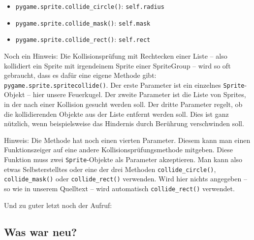 \begin{itemize}
    \item \texttt{pygame.sprite.collide\_circle()}: \texttt{self.radius}
    \item \texttt{pygame.sprite.collide\_mask()}: \texttt{self.mask}
    \item \texttt{pygame.sprite.collide\_rect()}: \texttt{self.rect}
\end{itemize}


Noch ein Hinweis: Die Kollisionsprüfung mit Rechtecken einer Liste -- also kollidiert ein Sprite mit irgendeinem Sprite einer SpriteGroup -- wird so oft gebraucht, dass es dafür eine eigene Methode gibt: \texttt{pygame.sprite.spritecollide()}. Der erste Parameter ist ein einzelnes \texttt{Sprite}-Objekt -- hier unsere Feuerkugel. Der zweite Parameter ist die Liste von Sprites, in der nach einer Kollision gesucht werden soll. Der dritte Parameter regelt, ob die kollidierenden Objekte aus der Liste entfernt werden soll. Dies ist ganz nützlich, wenn beispielsweise das Hindernis durch Berührung verschwinden soll. 

Hinweis: Die Methode hat noch einen vierten Parameter. Diesem kann man einen Funktionszeiger auf eine andere Kollisionsprüfungsmethode mitgeben. Diese Funktion muss zwei \texttt{Sprite}-Objekte als Parameter akzeptieren. Man kann also etwas Selbsterstelltes oder eine der drei Methoden \texttt{collide\_circle()}, \texttt{collide\_mask()} oder \texttt{collide\_rect()} verwenden. Wird hier nichts angegeben -- so wie in unserem Quelltext -- wird automatisch \texttt{collide\_rect()} verwendet.


Und zu guter letzt noch der Aufruf:



\subsection*{Was war neu?}

